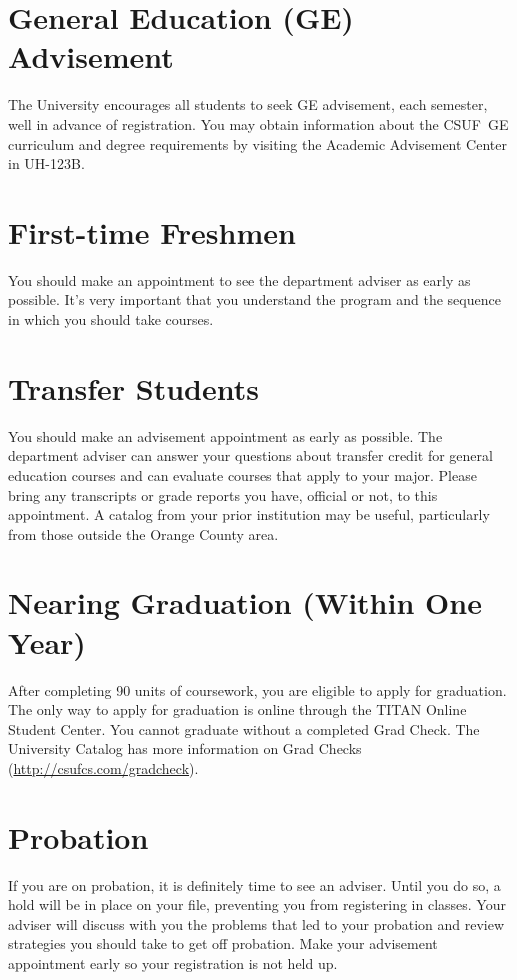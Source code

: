 \documentclass{book}
\newcommand{\CampusName}{CSUF}
\newcommand{\shrunkurl}[1]{\url{http://csufcs.com/#1}}
\begin{document}
\section{General Education (GE) Advisement}
 
The University encourages all students to seek GE advisement, each semester, well in advance of registration.  You may obtain information about the \CampusName~GE curriculum and degree requirements by visiting the Academic Advisement Center in UH-123B.

\section{First-time Freshmen}
You should make an appointment to see the department adviser as early as possible. It's very important that you understand the program and the sequence in which you should take courses.

\section{Transfer Students}
You should make an advisement appointment as early as possible. The department adviser can answer your questions about transfer credit for general education courses and can evaluate courses that apply to your major. Please bring any transcripts or grade reports you have, official or not, to this appointment. A catalog from your prior institution may be useful, particularly from those outside the Orange County area.

\section{Nearing Graduation (Within One Year)}
After completing 90 units of coursework, you are eligible to apply for graduation. The only way to apply for graduation is online through the TITAN Online Student Center. You cannot graduate without a completed Grad Check.  The University Catalog has more information on Grad Checks (\shrunkurl{gradcheck}).

\section{Probation}
If you are on probation, it is definitely time to see an adviser. Until you do so, a hold will be in place on your file, preventing you from registering in classes. Your adviser will discuss with you the problems that led to your probation and review strategies you should take to get off probation. Make your advisement appointment early so your registration is not held up.
\end{document}
